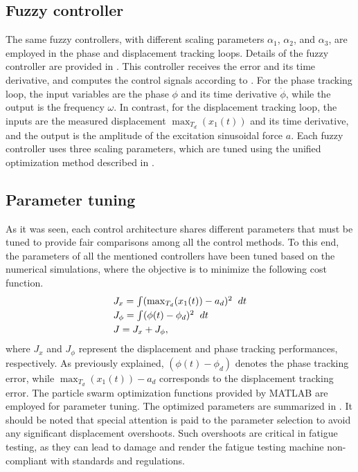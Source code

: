 \documentclass[preprint,12pt]{elsarticle}
\begin{document}
\subsection{Fuzzy controller} \label{S_designed_fuzzy}

The same fuzzy controllers, with different scaling parameters $\alpha_1$, $\alpha_2$, and $\alpha_3$, are employed in the phase and displacement tracking loops. Details of the fuzzy controller are provided in . This controller receives the error and its time derivative, and computes the control signals according to . For the phase tracking loop, the input variables are the phase $\phi$ and its time derivative $\dot{\phi}$, while the output is the frequency $\omega$. In contrast, for the displacement tracking loop, the inputs are the measured displacement $\max_{T_d}(x_1(t))$ and its time derivative, and the output is the amplitude of the excitation sinusoidal force $a$. Each fuzzy controller uses three scaling parameters, which are tuned using the unified optimization method described in .


\subsection{Parameter tuning} \label{S_tuning}

As it was seen, each control architecture shares different parameters that must be tuned to provide fair comparisons among all the control methods. To this end, the parameters of all the mentioned controllers have been tuned based on the numerical simulations, where the objective is to minimize the following cost function.
\begin{equation}
\begin{array}{l}
J_x=\int (\max_{T_d}(x_1(t))-a_d)^2 \hspace{0.2cm}  dt \vspace{0.1cm} \\
J_\phi=\int  (\phi(t)-\phi_d)^2  \hspace{0.2cm}  dt \vspace{0.1cm}  \\
J=J_x+J_\phi ,
\end{array}
\label{E_objective}
\end{equation}
where $J_x$ and $J_\phi$ represent the displacement and phase tracking performances, respectively. As previously explained, $(\phi(t) - \phi_d)$ denotes the phase tracking error, while $\max_{T_d}(x_1(t)) - a_d$ corresponds to the displacement tracking error. The {\selectfont particle swarm optimization} functions provided by {\selectfont MATLAB} are employed for parameter tuning. The optimized parameters are summarized in . It should be noted that special attention is paid to the parameter selection to avoid any significant displacement overshoots. Such overshoots are critical in fatigue testing, as they can lead to damage and render the fatigue testing machine non-compliant with standards and regulations.
\end{document}
